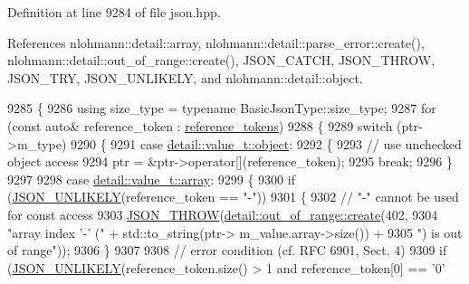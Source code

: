 Definition at line 9284 of file json.\+hpp.



References nlohmann\+::detail\+::array, nlohmann\+::detail\+::parse\+\_\+error\+::create(), nlohmann\+::detail\+::out\+\_\+of\+\_\+range\+::create(), J\+S\+O\+N\+\_\+\+C\+A\+T\+CH, J\+S\+O\+N\+\_\+\+T\+H\+R\+OW, J\+S\+O\+N\+\_\+\+T\+RY, J\+S\+O\+N\+\_\+\+U\+N\+L\+I\+K\+E\+LY, and nlohmann\+::detail\+::object.


\begin{DoxyCode}
9285     \{
9286         \textcolor{keyword}{using} size\_type = \textcolor{keyword}{typename} BasicJsonType::size\_type;
9287         \textcolor{keywordflow}{for} (\textcolor{keyword}{const} \textcolor{keyword}{auto}& reference\_token : \hyperlink{classnlohmann_1_1json__pointer_a07a990a6838de4f38ee9d881e7b9fd61}{reference\_tokens})
9288         \{
9289             \textcolor{keywordflow}{switch} (ptr->m\_type)
9290             \{
9291                 \textcolor{keywordflow}{case} \hyperlink{namespacenlohmann_1_1detail_a1ed8fc6239da25abcaf681d30ace4985aa8cfde6331bd59eb2ac96f8911c4b666}{detail::value\_t::object}:
9292                 \{
9293                     \textcolor{comment}{// use unchecked object access}
9294                     ptr = &ptr->operator[](reference\_token);
9295                     \textcolor{keywordflow}{break};
9296                 \}
9297 
9298                 \textcolor{keywordflow}{case} \hyperlink{namespacenlohmann_1_1detail_a1ed8fc6239da25abcaf681d30ace4985af1f713c9e000f5d3f280adbd124df4f5}{detail::value\_t::array}:
9299                 \{
9300                     \textcolor{keywordflow}{if} (\hyperlink{json_8hpp_ab77582407c64944e7db1ea95ab520253}{JSON\_UNLIKELY}(reference\_token == \textcolor{stringliteral}{"-"}))
9301                     \{
9302                         \textcolor{comment}{// "-" cannot be used for const access}
9303                         \hyperlink{json_8hpp_a6c274f6db2e65c1b66c7d41b06ad690f}{JSON\_THROW}(\hyperlink{classnlohmann_1_1detail_1_1out__of__range_a3f6d82a6f967c4728a1ec735a7867073}{detail::out\_of\_range::create}(402,
9304                                                                 \textcolor{stringliteral}{"array index '-' ("} + std::to\_string(ptr->
      m\_value.array->size()) +
9305                                                                 \textcolor{stringliteral}{") is out of range"}));
9306                     \}
9307 
9308                     \textcolor{comment}{// error condition (cf. RFC 6901, Sect. 4)}
9309                     \textcolor{keywordflow}{if} (\hyperlink{json_8hpp_ab77582407c64944e7db1ea95ab520253}{JSON\_UNLIKELY}(reference\_token.size() > 1 and reference\_token[0] == \textcolor{charliteral}{'0'}

\end{DoxyCode}
